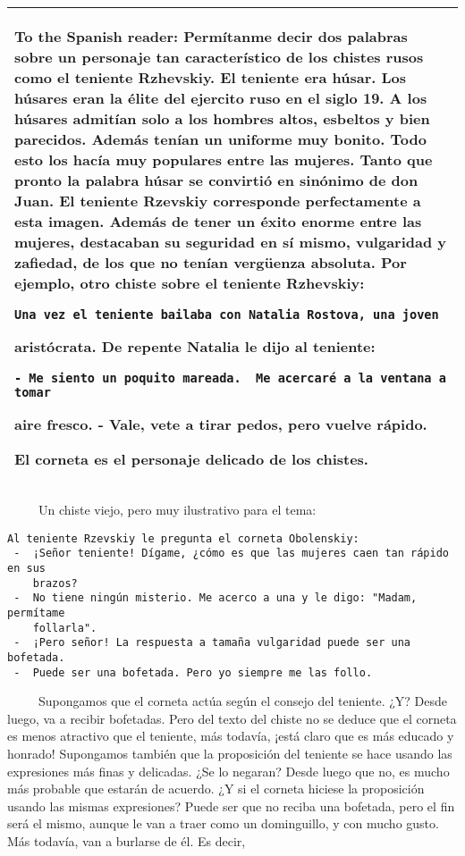 \begin{longtable}[]{@{}l@{}}
\toprule
\begin{minipage}[t]{0.97\columnwidth}\raggedright\strut
\textbf{To the Spanish reader:} Permítanme decir dos palabras sobre un
personaje tan característico de los chistes rusos como el teniente
Rzhevskiy. El teniente era húsar. Los húsares eran la élite del ejercito
ruso en el siglo 19. A los húsares admitían solo a los hombres altos,
esbeltos y bien parecidos. Además tenían un uniforme muy bonito. Todo
esto los hacía muy populares entre las mujeres. Tanto que pronto la
palabra húsar se convirtió en sinónimo de don Juan. El teniente Rzevskiy
corresponde perfectamente a esta imagen. Además de tener un éxito enorme
entre las mujeres, destacaban su seguridad en sí mismo, vulgaridad y
zafiedad, de los que no tenían vergüenza absoluta. Por ejemplo, otro
chiste sobre el teniente Rzhevskiy:

\begin{verbatim}
Una vez el teniente bailaba con Natalia Rostova, una joven
\end{verbatim}

aristócrata. De repente Natalia le dijo al teniente:

\begin{verbatim}
- Me siento un poquito mareada.  Me acercaré a la ventana a tomar
\end{verbatim}

aire fresco. - Vale, vete a tirar pedos, pero vuelve rápido.

El corneta es el personaje delicado de los chistes.\strut
\end{minipage}\tabularnewline
\bottomrule
\end{longtable}

~ ~ ~ Un chiste viejo, pero muy ilustrativo para el tema:

\begin{verbatim}
Al teniente Rzevskiy le pregunta el corneta Obolenskiy:
 -  ¡Señor teniente! Dígame, ¿cómo es que las mujeres caen tan rápido en sus
    brazos?
 -  No tiene ningún misterio. Me acerco a una y le digo: "Madam, permítame
    follarla".
 -  ¡Pero señor! La respuesta a tamaña vulgaridad puede ser una bofetada.
 -  Puede ser una bofetada. Pero yo siempre me las follo.
\end{verbatim}

~ ~ ~ Supongamos que el corneta actúa según el consejo del teniente. ¿Y?
Desde luego, va a recibir bofetadas. Pero del texto del chiste no se
deduce que el corneta es menos atractivo que el teniente, más todavía,
¡está claro que es más educado y honrado! Supongamos también que la
proposición del teniente se hace usando las expresiones más finas y
delicadas. ¿Se lo negaran? Desde luego que no, es mucho más probable que
estarán de acuerdo. ¿Y si el corneta hiciese la proposición usando las
mismas expresiones? Puede ser que no reciba una bofetada, pero el fin
será el mismo, aunque le van a traer como un dominguillo, y con mucho
gusto. Más todavía, van a burlarse de él. Es decir,

